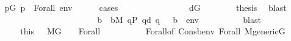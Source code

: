 \begin{isabellebody}
\isanewline
\ \ \ \ \isamarkupfalse%
\ {\isachardoublequoteopen}{\isasymexists}p{\isasymin}G{\isachardot}{\kern0pt}\ {\isacharparenleft}{\kern0pt}p\ {\isasymtturnstile}\ Forall{\isacharparenleft}{\kern0pt}{\isasymphi}{\isacharparenright}{\kern0pt}\ env{\isacharparenright}{\kern0pt}{\isachardoublequoteclose}\isanewline
\ \ \ \ \isamarkupfalse%
\ {\isacharparenleft}{\kern0pt}cases{\isacharparenright}{\kern0pt}\isanewline
\ \ \ \ \ \ \isamarkupfalse%
\ {}\isanewline
\ \ \ \ \ \ \isamarkupfalse%
\ {\isacartoucheopen}d{\isasymin}G{\isacartoucheclose}\isanewline
\ \ \ \ \ \ \isamarkupfalse%
\ {\isacharquery}{\kern0pt}thesis\ \isamarkupfalse%
\ blast\isanewline
\ \ \ \ \isamarkupfalse%
\isanewline
\ \ \ \ \ \ \isamarkupfalse%
\ {}\isanewline
\ \ \ \ \ \ \isamarkupfalse%
\isanewline
\ \ \ \ \ \ \isamarkupfalse%
\ b\ \ {\isachardoublequoteopen}b{\isasymin}M{\isachardoublequoteclose}\ {\isachardoublequoteopen}{\isasymforall}q{\isasymin}P{\isachardot}{\kern0pt}\ q{\isasympreceq}d\ {\isasymlongrightarrow}{\isasymnot}{\isacharparenleft}{\kern0pt}q\ {\isasymtturnstile}\ {\isasymphi}\ {\isacharparenleft}{\kern0pt}{\isacharbrackleft}{\kern0pt}b{\isacharbrackright}{\kern0pt}\ {\isacharat}{\kern0pt}\ env{\isacharparenright}{\kern0pt}{\isacharparenright}{\kern0pt}{\isachardoublequoteclose}\isanewline
\ \ \ \ \ \ \ \ \isamarkupfalse%
\ blast\isanewline
\ \ \ \ \ \ \isamarkupfalse%
\ \isamarkupfalse%
\ this{\isacharparenleft}{\kern0pt}{}{\isacharparenright}{\kern0pt}\ \ \ {\isacartoucheopen}M{\isacharbrackleft}{\kern0pt}G{\isacharbrackright}{\kern0pt}{\isacharcomma}{\kern0pt}\ {\isacharunderscore}{\kern0pt}\ {\isasymTurnstile}\ \ Forall{\isacharparenleft}{\kern0pt}{\isasymphi}{\isacharparenright}{\kern0pt}{\isacartoucheclose}\ \ \isanewline
\ \ \ \ \ \ \ \ Forall{\isacharparenleft}{\kern0pt}{}{\isacharparenright}{\kern0pt}{\isacharbrackleft}{\kern0pt}of\ {\isachardoublequoteopen}Cons{\isacharparenleft}{\kern0pt}b{\isacharcomma}{\kern0pt}env{\isacharparenright}{\kern0pt}{\isachardoublequoteclose}{\isacharbrackright}{\kern0pt}\ Forall{\isacharparenleft}{\kern0pt}{}{\isacharcomma}{\kern0pt}{}{\isacharminus}{\kern0pt}{}{\isacharparenright}{\kern0pt}\ {\isacartoucheopen}M{\isacharunderscore}{\kern0pt}generic{\isacharparenleft}{\kern0pt}G{\isacharparenright}{\kern0pt}{\isacartoucheclose}\isanewline

\end{isabellebody}

